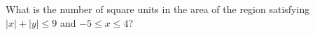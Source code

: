 What is the number of square units in the area of the region satisfying $|x|+|y|\le9$ and $-5\le x\le4$?
